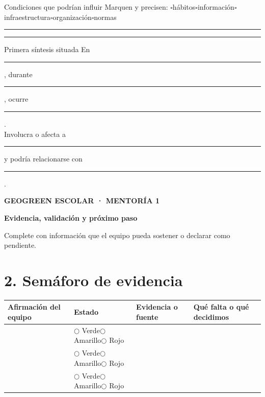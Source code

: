 \documentclass[10pt,a4paper]{article}
\newcommand{\writearea}[1]{\vspace{#1}\hrule height 0.35pt\vspace{4mm}\hrule height 0.35pt}
\newcommand{\checkline}[1]{$\square$\hspace{1.5mm}#1}
\begin{document}
\begin{fieldbox}[height=33mm]{Condiciones que podrían influir}
Marquen y precisen: \checkline{hábitos}\hspace{3mm}\checkline{información}\hspace{3mm}\checkline{infraestructura}\hspace{3mm}\checkline{organización}\hspace{3mm}\checkline{normas}
\writearea{5mm}
\end{fieldbox}

\begin{accentfield}[height=39mm]{Primera síntesis situada}
En \rule{38mm}{0.35pt}, durante \rule{34mm}{0.35pt}, ocurre \rule{55mm}{0.35pt}.\\[5mm]
Involucra o afecta a \rule{47mm}{0.35pt} y podría relacionarse con \rule{53mm}{0.35pt}.
\end{accentfield}

\newpage
{\small\bfseries\textcolor{AIEPRed}{GEOGREEN ESCOLAR · MENTORÍA 1}}\par
\vspace{2mm}
{\LARGE\bfseries\color{AIEPNavy}Evidencia, validación y próximo paso\par}
{\normalsize\color{AIEPMuted}Complete con información que el equipo pueda sostener o declarar como pendiente.\par}

\section*{2. Semáforo de evidencia}
\vspace{-2mm}
{\small
\begin{tabularx}{\textwidth}{|Y|p{25mm}|p{48mm}|p{52mm}|}
\hline
\textbf{Afirmación del equipo} & \textbf{Estado} & \textbf{Evidencia o fuente} & \textbf{Qué falta o qué decidimos} \\
\hline
\rule{0pt}{14mm} & $\bigcirc$ Verde\newline $\bigcirc$ Amarillo\newline $\bigcirc$ Rojo & & \\
\hline
\rule{0pt}{14mm} & $\bigcirc$ Verde\newline $\bigcirc$ Amarillo\newline $\bigcirc$ Rojo & & \\
\hline
\rule{0pt}{14mm} & $\bigcirc$ Verde\newline $\bigcirc$ Amarillo\newline $\bigcirc$ Rojo & & \\
\hline
\end{tabularx}}
\end{document}
